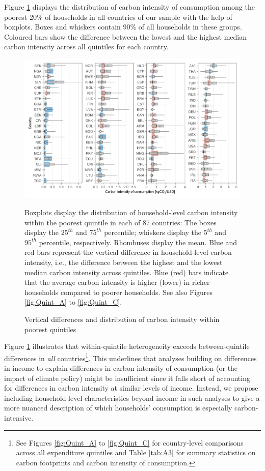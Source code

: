 \documentclass[12pt, a4paper]{article}
\newenvironment{subcaption}
{\strut
\vspace{-5pt}
\begin{minipage}[b]{0.9\textwidth}
  \hspace*{-\parindent}
  \footnotesize}
 {\end{minipage}}
\begin{document}
Figure \ref{fig:fig_1} displays the distribution of carbon intensity of consumption among the poorest 20\% of households in all countries of our sample with the help of boxplots. Boxes and whiskers contain 90\% of all households in these groups. Coloured bars show the difference between the lowest and the highest median carbon intensity across all quintiles for each country.

\begin{figure}[ht!]
    \centering
    \includegraphics{Figure 1/Figure_1_2017}
    \caption{Vertical differences and distribution of carbon intensity within poorest quintiles}
    \label{fig:fig_1}
    \begin{subcaption}
    Boxplots display the distribution of household-level carbon intensity within the poorest quintile in each of 87 countries: The boxes display the $25^{th}$ and $75^{th}$ percentile; whiskers display the $5^{th}$ and $95^{th}$ percentile, respectively. Rhombuses display the mean. Blue and red bars represent the vertical difference in household-level carbon intensity, i.e., the difference between the highest and the lowest median carbon intensity across quintiles. Blue (red) bars indicate that the average carbon intensity is higher (lower) in richer households compared to poorer households. See also Figures \ref{fig:Quint_A} to \ref{fig:Quint_C}.
    \end{subcaption}
\end{figure}

Figure \ref{fig:fig_1} illustrates that within-quintile heterogeneity exceeds between-quintile differences in \textit{all} countries\footnote{See Figures \ref{fig:Quint_A} to \ref{fig:Quint_C} for country-level comparisons across all expenditure quintiles and Table \ref{tab:A3} for summary statistics on carbon footprints and carbon intensity of consumption.}. This underlines that analyses building on differences in income to explain differences in carbon intensity of consumption (or the impact of climate policy) might be insufficient since it falls short of accounting for differences in carbon intensity at similar levels of income. Instead, we propose including household-level characteristics beyond income in such analyses to give a more nuanced description of which households' consumption is especially carbon-intensive.
\end{document}
